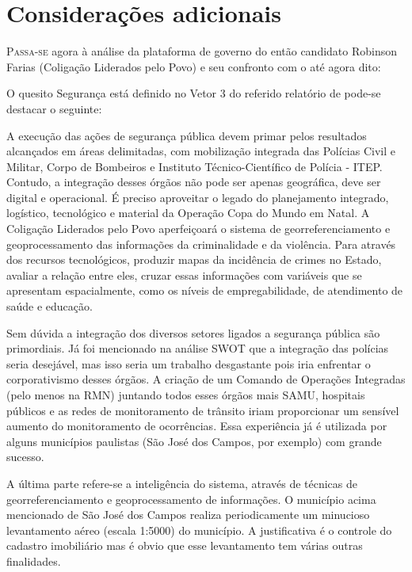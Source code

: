 \documentclass[
	12pt,				%
	openright,			%
	twoside,			%
	a4paper,			%
	chapter=TITLE,		%
	section=TITLE,		%
	subsection=TITLE,	%
	subsubsection=TITLE,%
	spanish,            %
	english,			%
	brazil				%
	]{abntex2}
\begin{document}
\section{Considerações adicionais}
\lettrine[lines=2, lhang=0.33, loversize=0.25]{P}{assa-se} agora à análise da plataforma de governo do então candidato Robinson Farias (Coligação Liderados pelo Povo) e seu confronto com o até agora dito:
\par
O quesito Segurança está definido no Vetor 3 do referido relatório de pode-se destacar o seguinte:
\begin{citacao}
	A execução das ações de segurança pública devem primar pelos resultados alcançados em
	áreas delimitadas, com mobilização integrada das Polícias Civil e Militar, Corpo de Bombeiros e
	Instituto Técnico-Científico de Polícia - ITEP.
	Contudo, a integração desses órgãos não pode ser apenas geográfica, deve ser digital e
	operacional. É preciso aproveitar o legado do planejamento integrado, logístico, tecnológico e
	material da Operação Copa do Mundo em Natal.
	A Coligação Liderados pelo Povo aperfeiçoará o sistema de georreferenciamento e geoprocessamento das informações da criminalidade e da violência. Para através dos recursos
	tecnológicos, produzir mapas da incidência de crimes no Estado, avaliar a relação entre eles,
	cruzar essas informações com variáveis que se apresentam espacialmente, como os níveis de
	empregabilidade, de atendimento de saúde e educação.\cite[p. ~26]{CLP}
\end{citacao}
\par
Sem dúvida a integração dos diversos setores ligados a segurança pública são primordiais. Já foi mencionado na análise SWOT que a integração
das polícias seria desejável, mas isso seria um trabalho desgastante pois iria enfrentar o corporativismo desses órgãos. A criação de um Comando de Operações Integradas (pelo menos na RMN) juntando todos esses órgãos mais SAMU, hospitais públicos e as redes de monitoramento de trânsito iriam proporcionar um sensível aumento do monitoramento de ocorrências. Essa experiência já é utilizada por alguns municípios paulistas (São José dos Campos, por exemplo) com grande sucesso.
\par
A última parte refere-se a inteligência do sistema, através de técnicas de georreferenciamento e geoprocessamento de informações. O município acima mencionado de São José dos Campos realiza periodicamente um minucioso levantamento aéreo (escala 1:5000) do município. A justificativa é o controle do cadastro imobiliário mas é obvio que esse levantamento tem várias outras finalidades.
\end{document}
